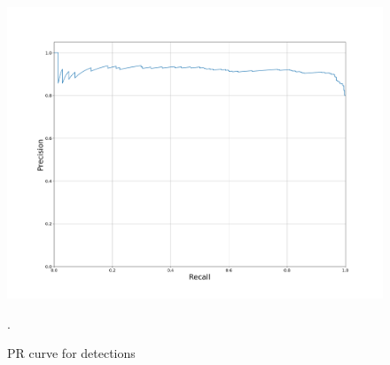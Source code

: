 %
\begin{figure}
  \centering
  \includegraphics[width=\columnwidth]{figures/pr_curve.png}
  \caption{PR curve for detections}.
  \label{fig:pr_curve}
\end{figure}
